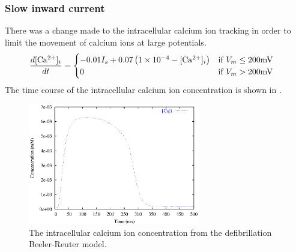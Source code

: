 \subsubsection{Slow inward current}
There was a change made to the intracellular calcium ion tracking in order to
limit the movement of calcium ions at large potentials.
\begin{gather}
  \label{eqn:two_cases_of_caiBRDR}
  \begin{aligned}
     \dfrac{ d  [\mathrm{Ca^{2+}}]_{i} }{d t}  &=
    \begin{cases}
      -0.01 I_s + 0.07\left( 1\times 10^{-4} -  [\mathrm{Ca^{2+}}]_{i}  \right)
        & \text{if $V_m \le 200\mathrm{mV}$} \\
      0
        & \text{if $V_m > 200\mathrm{mV}$} 
    \end{cases}
  \end{aligned}
\end{gather}
The time course of the intracellular calcium ion concentration is shown in
. 
\begin{figure}[hbtp] 
  \centering
  \includegraphics[width=75mm]{cardiac_electrophysiology/epsfiles/BRDR_Cai.eps}
  \caption[Defibrillation Beeler-Reuter intracellular calcium concentration]{The
    intracellular calcium ion concentration from the defibrillation Beeler-Reuter model.}
  \label{fig:BRDR_cai}
\end{figure}

